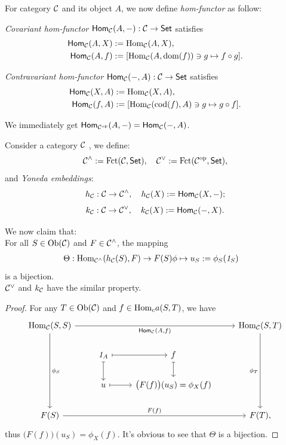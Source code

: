 \documentclass{article}
\begin{document}
\begin{defi}
	For category $\mathcal{C}$ and its object $A$, we now define \emph{hom-functor} as follow:
	
	\emph{Covariant hom-functor} $\mathsf{Hom}_{\mathcal{C}}(A,-):\mathcal{C}\to\mathsf{Set}$ satisfies
	\begin{align*}
		\mathsf{Hom}_{\mathcal{C}}(A,X) &:= \mathrm{Hom}_{\mathcal{C}}(A,X),\\
		\mathsf{Hom}_{\mathcal{C}}(A,f) &:= [\mathrm{Hom}_{\mathcal{C}}(A,\mathrm{dom}(f))\ni g\mapsto f\circ g].
	\end{align*}
	
	\emph{Contravariant hom-functor} $\mathsf{Hom}_{\mathcal{C}}(-,A):\mathcal{C}\to\mathsf{Set}$ satisfies
	\begin{align*}
		\mathsf{Hom}_{\mathcal{C}}(X,A) &:= \mathrm{Hom}_{\mathcal{C}}(X,A),\\
		\mathsf{Hom}_{\mathcal{C}}(f,A) &:= [\mathrm{Hom}_{\mathcal{C}}(\mathrm{cod}(f),A)\ni g\mapsto g\circ f].
	\end{align*}
	
	We immediately get $\mathsf{Hom}_{\mathcal{C}^\mathrm{op}}(A,-)=\mathsf{Hom}_{\mathcal{C}}(-,A)$.
\end{defi}


\begin{thm}
	Consider a category $\mathcal{C}$ , we define:
		$$\mathcal{C}^\wedge:=\mathrm{Fct}(\mathcal{C},\mathsf{Set}),\quad\mathcal{C}^\vee:=\mathrm{Fct}(\mathcal{C}^\mathrm{op},\mathsf{Set}),$$
	and \emph{Yoneda embeddings}:
		$$h_{\mathcal{C}}:\mathcal{C}\to\mathcal{C}^\wedge,\quad h_{\mathcal{C}}(X):=\mathsf{Hom}_{\mathcal{C}}(X,-);$$
		$$k_{\mathcal{C}}:\mathcal{C}\to\mathcal{C}^\vee  ,\quad k_{\mathcal{C}}(X):=\mathsf{Hom}_{\mathcal{C}}(-,X).$$
	
	We now claim that:\\
	For all $S\in\mathrm{Ob}(\mathcal{C})$ and $F\in\mathcal{C}^\wedge$, the mapping
	\begin{align*}
		\Theta:\mathrm{Hom}_{\mathcal{C}^\wedge}(h_{\mathcal{C}}(S),F) &\to F(S)
		\phi\mapsto u_S:=\phi_S(\mathit{1}_S)
	\end{align*}
	is a bijection.\\
	$\mathcal{C}^\vee$ and $k_{\mathcal{C}}$ have the similar property.
\end{thm}

\begin{proof}
	For any $T\in\mathrm{Ob}(\mathcal{C})$ and $f\in\mathrm{Hom}_ca(S,T)$, we have
	\[\begin{tikzcd}
		{\Hom_\ca(S,S)} \arrow[rrr, "{\mathsf{Hom}_\ca(A,f)}"'] \arrow[ddd, "\phi_S"] & & & {\Hom_\ca(S,T)} \arrow[ddd, "\phi_T"']\\ &
		\1_A \arrow[r, maps to] \arrow[d, maps to] & f \arrow[d, maps to] & \\ &
		u \arrow[r, maps to] & \big(F(f)\big)(u_S)=\phi_X(f) & \\
		F(S) \arrow[rrr, "F(f)"] & & & F(T),
	\end{tikzcd}\]
	thus $\big(F(f)\big)(u_S)=\phi_X(f)$. It's obvious to see that $\Theta$ is a bijection.
\end{proof}


\end{document}

